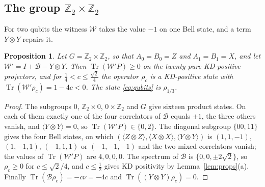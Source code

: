\documentclass[11pt,a4paper]{article}
\newtheorem{proposition}[theorem]{Proposition}
\theoremstyle{definition}
\theoremstyle{plain}
\DeclareMathOperator{\Tr}{Tr}
\newcommand{\Z}{\mathbb Z}
\newcommand{\B}{\mathcal B}
\newcommand{\Wc}{\mathcal W}
\begin{document}
\subsection{The group $\Z_2\times\Z_2$}
For two qubits the witness $\Wc$ takes the value $-1$ on one Bell state, and
a term $Y\otimes Y$ repairs it.

\begin{proposition}\label{prop:Z2Z2}
Let $G=\Z_2\times\Z_2$, so that $A_0=B_0=Z$ and $A_1=B_1=X$, and let
$\Wc'=I+\B-Y\otimes Y$. Then $\Tr(\Wc'P)\geq0$ on the twenty pure KD-positive
projectors, and for $\frac14<c\leq\frac{\sqrt2}4$ the operator $\rho_c$ is a
KD-positive state with $\Tr(\Wc'\rho_c)=1-4c<0$. The state \eqref{eq:qubits}
is $\rho_{1/3}$.
\end{proposition}

\begin{proof}
The subgroups $0$, $\Z_2\times0$, $0\times\Z_2$ and $G$ give sixteen product
states. On each of them exactly one of the four correlators of $\B$ equals
$\pm1$, the three others vanish, and $\langle Y\otimes Y\rangle=0$, so
$\Tr(\Wc'P)\in\{0,2\}$. The diagonal subgroup $\{00,11\}$ gives the four Bell
states, on which $(\langle Z\otimes Z\rangle,\langle X\otimes X\rangle,
\langle Y\otimes Y\rangle)$ is $(1,1,-1)$, $(1,-1,1)$, $(-1,1,1)$ or
$(-1,-1,-1)$ and the two mixed correlators vanish; the values of
$\Tr(\Wc'P)$ are $4,0,0,0$. The spectrum of $\B$ is $\{0,0,\pm2\sqrt2\}$, so
$\rho_c\geq0$ for $c\leq\sqrt2/4$, and $c\leq\frac12$ gives KD positivity by
Lemma~\ref{lem:props}(a). Finally $\Tr(\B\rho_c)=-c\nu=-4c$ and
$\Tr((Y\otimes Y)\rho_c)=0$.
\end{proof}
\end{document}

